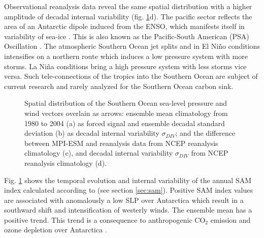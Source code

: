 Observational reanalysis data reveal the same spatial distribution with a higher amplitude of decadal internal variability (fig. \ref{fig:SO_winds_ensmean_ensstd}d). The pacific sector reflects the area of an Antarctic dipole induced from the \ac{ENSO}, which manifests itself in variability of sea-ice \citep{Yuan2004}. This is also known as the Pacific-South American (PSA) Oscillation \citep{Sallee2008}. The atmospheric Southern Ocean jet splits and in El Ni\~{n}o conditions intensifies on a northern route which induces a low pressure system with more storms. La Ni\~{n}a conditions bring a high pressure system with less storms vice versa. Such tele-connections of the tropics into the Southern Ocean are subject of current research and rarely analyzed for the Southern Ocean carbon sink.\newline


\begin{figure}[h!]
	\centering
	\caption{Spatial distribution of the Southern Ocean sea-level pressure and wind vectors overlain as arrows: ensemble mean climatology from 1980 to 2004 (a) as forced signal and ensemble decadal standard deviation (b) as decadal internal variability $\sigma_{DIV}$; and the difference between \acs{MPI-ESM} and reanalysis data from \acs{NCEP} reanalysis climatology \citep{Kalnay1996} (c), and decadal internal variability $\sigma_{DIV}$ from NCEP reanalysis climatology (d).}
	\label{fig:SO_winds_ensmean_ensstd}
\end{figure}

Fig. \ref{fig:SO_winds_ensmean_ensstd} shows the temporal evolution and internal variability of the annual \ac{SAM} index calculated according to \citep{Gong1999} (see section \ref{sec:sam}). Positive \acs{SAM} index values are associated with anomalously a low \acs{SLP} over Antarctica which result in a southward shift and intensification of westerly winds. The ensemble mean has a positive trend. This trend is a consequence to anthropogenic CO$_2$ emission and ozone depletion over Antarctica \citep{Thompson2000}.\newline

